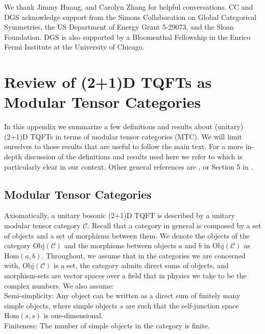 \documentclass[11pt]{article}
\numberwithin{equation}{section}
\begin{document}
We thank Jimmy Huang, and Carolyn Zhang for helpful conversations. CC and DGS acknowledge support from the Simons Collaboration on Global Categorical Symmetries, the US Department of Energy Grant 5-29073, and the Sloan Foundation. DGS is also supported by a Bloomenthal Fellowship in the Enrico Fermi Institute at the University of Chicago.


\appendix





\section{Review of (2+1)D TQFTs as Modular Tensor Categories} \label{mathsappendix}

In this appendix we summarize a few definitions and results about (unitary) (2+1)D TQFTs in terms of modular tensor categories (MTC). We will limit ourselves to those results that are useful to follow the main text. For a more in-depth discussion of the definitions and results used here we refer to \cite{Frohlich:2003hm} which is particularly clear in our context. Other general references are \cite{Kitaev:2005hzj}, or Section 5 in \cite{Benini:2018reh}. 

\subsection{Modular Tensor Categories}

Axiomatically, a unitary bosonic (2+1)D TQFT is described by a unitary modular tensor category $\mathcal{C}$. Recall that a category in general is composed by a set of objects and a set of morphisms between them. We denote the objects of the category $\mathrm{Obj}(\mathcal{C})$ and the morphisms between objects $a$ and $b$ in $\mathrm{Obj}(\mathcal{C})$ as $\mathrm{Hom}(a,b)$. Throughout, we assume that in the categories we are concerned with, $\mathrm{Obj}(\mathcal{C})$ is a set, the category admits direct sums of objects, and morphism-sets are vector spaces over a field that in physics we take to be the complex numbers. We also assume: \\

Semi-simplicity: Any object can be written as a direct sum of finitely many simple objects, where simple objects $s$ are such that the self-junction space $\mathrm{Hom}(s,s)$ is one-dimensional. \\

Finiteness: The number of simple objects in the category is finite. \\
\end{document}
